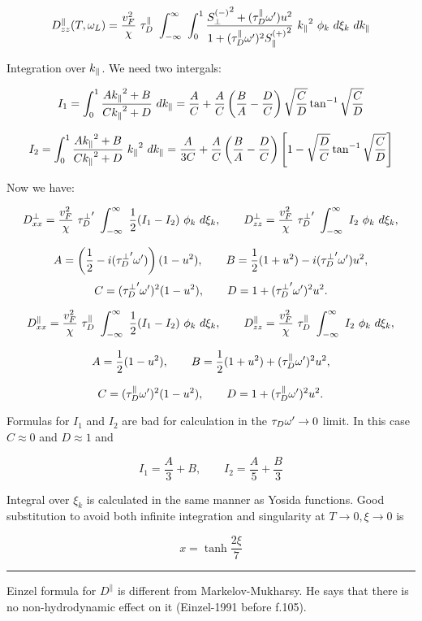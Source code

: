 \documentclass[a4paper]{article}
\begin{document}
$$
D^\parallel_{zz}(T, \omega_L) =
  \frac{v_F^2}{\chi}\ \tau_D^\parallel
  \ \int_{-\infty}^{\infty}\ \int_{0}^{1}
  \frac{{S_\perp^{(-)}}^2 + (\tau_D^\parallel\omega^\prime)u^2 }{1+(\tau_D^\parallel\omega^\prime)^2{S_\parallel^{(+)}}^2}
  \  {k_\parallel}^2\ \phi_k\ d\xi_k\ d{k_\parallel}
$$

\eject
Integration over ${k_\parallel}$. We need two intergals:

$$
I_1 = \int_0^1 \frac{A{k_\parallel}^2 + B}{C {k_\parallel}^2 + D}\ d{k_\parallel} = 
\frac{A}{C} + \frac{A}{C}\left(\frac{B}{A} - \frac{D}{C}\right)
\sqrt{\frac{C}{D}}\tan^{-1}\sqrt{\frac{C}{D}}
$$

$$
I_2 = \int_0^1 \frac{A{k_\parallel}^2 + B}{C {k_\parallel}^2 + D}\ {k_\parallel}^2\ d{k_\parallel} =
\frac{A}{3C} + \frac{A}{C}\left(\frac{B}{A} - \frac{D}{C}\right)
\left[ 1 - \sqrt{\frac{D}{C}}\tan^{-1}\sqrt{\frac{C}{D}} \right]
$$

Now we have:

$$
D^\perp_{xx} =
  \frac{v_F^2}{\chi}\ {\tau_D^\perp}^\prime
  \ \int_{-\infty}^{\infty}
  \ \frac12 (I_1-I_2)\ \phi_k\ d\xi_k,
\qquad
D^\perp_{zz} =
  \frac{v_F^2}{\chi}\ {\tau_D^\perp}^\prime
  \ \int_{-\infty}^{\infty}
  \ I_2\ \phi_k\ d\xi_k,
$$

$$
A = \left(\frac12 - i({\tau_D^\perp}^\prime\omega^\prime)\right) (1-u^2), \qquad
B = \frac12 (1+u^2) - i({\tau_D^\perp}^\prime\omega^\prime) u^2,
$$
$$
C = ({\tau_D^\perp}^\prime\omega^\prime)^2 (1-u^2),\qquad
D = 1 + ({\tau_D^\perp}^\prime\omega^\prime)^2 u^2.
$$

$$
D^\parallel_{xx} =
  \frac{v_F^2}{\chi}\ \tau_D^\parallel
  \ \int_{-\infty}^{\infty}
  \ \frac12 (I_1-I_2)\ \phi_k\ d\xi_k,
\qquad
D^\parallel_{zz} =
  \frac{v_F^2}{\chi}\ \tau_D^\parallel
  \ \int_{-\infty}^{\infty}
  \ I_2\ \phi_k\ d\xi_k,
$$

$$
A = \frac12 (1-u^2), \qquad
B = \frac12 (1+u^2) + (\tau_D^\parallel\omega^\prime)^2 u^2,
$$

$$
C = (\tau_D^\parallel\omega^\prime)^2 (1-u^2),\qquad
D = 1 + (\tau_D^\parallel\omega^\prime)^2 u^2.
$$

Formulas for $I_1$ and $I_2$ are bad for calculation in the $\tau_D\omega^\prime \to
0$ limit. In this case $C \approx 0$ and $D \approx 1$ and

$$
I_1 = \frac{A}{3}+B,\qquad
I_2 = \frac{A}{5}+\frac{B}{3}
$$

Integral over $\xi_k$ is calculated in the same manner as Yosida
functions. Good substitution to avoid both infinite integration and
singularity at $T \rightarrow 0, \xi \rightarrow 0$ is

$$
x = \tanh \frac{2\xi}{7}
$$

\hrule\medskip

Einzel formula for $D^\parallel$ is different from Markelov-Mukharsy. He
says that there is no non-hydrodynamic effect on it (Einzel-1991 before
f.105).
\end{document}
